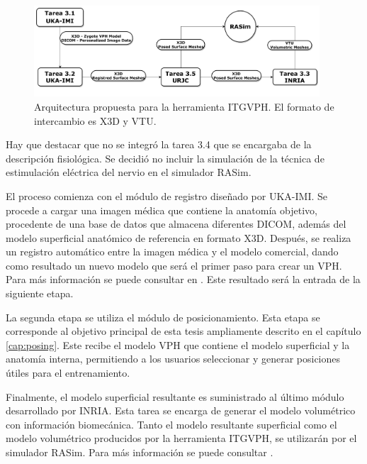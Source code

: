 \begin{figure}
    \centering
    \includegraphics[width=0.95\textwidth]{IMG/DiagramaITGVPH.pdf}
    \caption{Arquitectura propuesta para la herramienta \ac{ITGVPH}. El formato de intercambio es \ac{X3D} y \ac{VTU}.}
    \label{fig:toolarq}
\end{figure}

Hay que destacar que no se integró la tarea 3.4 que se encargaba de la descripción fisiológica. Se decidió no incluir la simulación de la técnica de estimulación eléctrica del nervio en el simulador \ac{RASim}.

El proceso comienza con el módulo de registro diseñado por \ac{UKA-IMI}. Se procede a cargar una imagen médica que contiene la anatomía objetivo, procedente de una base de datos que almacena diferentes \ac{DICOM}, además del modelo superficial anatómico de referencia en formato \ac{X3D}. Después, se realiza un registro automático entre la imagen médica y el modelo comercial, dando como resultado un nuevo modelo que será el primer paso para crear un \ac{VPH}. Para más información se puede consultar en \cite{deOliveira:2015}. Este resultado será la entrada de la siguiente etapa.

La segunda etapa se utiliza el módulo de posicionamiento. Esta etapa se corresponde al objetivo principal de esta tesis ampliamente descrito en el capítulo \ref{cap:posing}. Este recibe el modelo \ac{VPH} que contiene el modelo superficial y la anatomía interna, permitiendo a los usuarios seleccionar y generar posiciones útiles para el entrenamiento.

Finalmente, el modelo superficial resultante es suministrado al último módulo desarrollado por \ac{INRIA}. Esta tarea se encarga de generar el modelo volumétrico con  información biomecánica.
Tanto el modelo resultante superficial como el modelo volumétrico producidos por la herramienta \ac{ITGVPH}, se utilizarán por el simulador \ac{RASim}. Para más información se puede consultar \cite{ded3.3}.





